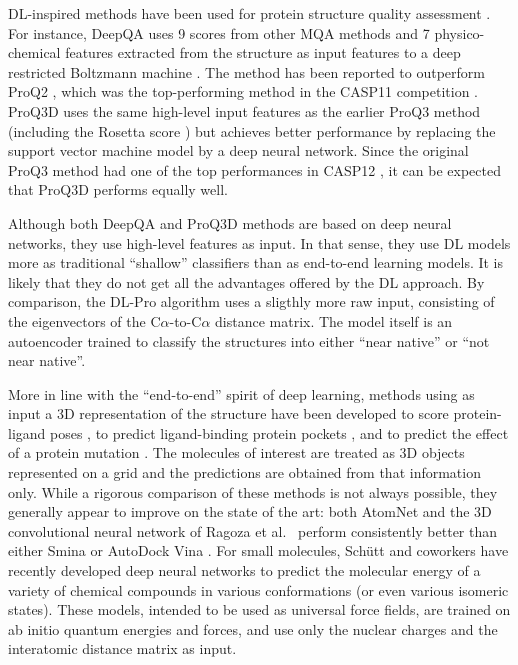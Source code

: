 \documentclass{bioinfo}
\begin{document}
DL-inspired methods have been used for protein structure quality
assessment \citep{nguyen2014dlpro, cao2016deepqa,
uziela2017proq3d}. For instance, DeepQA \citep{cao2016deepqa} uses 9
scores from other MQA methods and 7 physico-chemical features
extracted from the structure as input features to a deep restricted
Boltzmann machine \citep{hinton2006fast}. The method has been
reported to outperform ProQ2 \citep{ray2012proq2},
which was the top-performing method in the CASP11
competition \citep{kryshtafovych2015}.  ProQ3D \citep{uziela2017proq3d}
uses the same high-level input features as the earlier ProQ3
method \citep{uziela2016proq3} (including the
Rosetta score \citep{leaverfay2011rosetta}) but achieves better
performance by replacing the support vector machine model by a deep
neural network. Since the original ProQ3 method had one of the top
performances in CASP12 \citep{elofsson2017qacasp12}, it can be expected
that ProQ3D performs equally well.

Although both DeepQA and ProQ3D
methods are based on deep neural networks, they use high-level
features as input. In that sense, they use DL models more as
traditional ``shallow'' classifiers than as end-to-end learning
models. It is likely that they do not get all the advantages offered
by the DL approach.
By comparison, the DL-Pro algorithm \citep{nguyen2014dlpro} uses a
sligthly more raw input, consisting of the eigenvectors of the
C$\alpha$-to-C$\alpha$ distance matrix. The model itself is an
autoencoder \citep{hinton2006reducing} trained to classify the
structures into either ``near native'' or ``not near native''.

More in line with the ``end-to-end'' spirit of deep learning, methods
using as input a 3D representation of the structure have been
developed to score protein-ligand poses \citep{wallach2015atomnet,
ragoza2017protein}, to predict ligand-binding protein
pockets \citep{jimenez2017deepsite}, and to predict the effect of a
protein mutation \citep{torng2017}. The molecules of interest are
treated as 3D objects represented on a grid and the predictions are
obtained from that information only. While a rigorous comparison of
these methods is not always possible, they generally appear to
improve on the state of the art: both
AtomNet \citep{wallach2015atomnet} and the 3D convolutional neural
network of Ragoza et al.\ \citep{ragoza2017protein} perform
consistently better than either Smina \citep{koes2013smina} or AutoDock
Vina \citep{trott2009vina}.
For small molecules, Sch\"{u}tt and coworkers \cite{schutt2017quantum,
schutt2017moleculenet} have recently developed deep neural networks to predict
the molecular energy of a variety of chemical compounds in various
conformations (or even various isomeric states). These models,
intended to be used as universal force fields, are trained on ab
initio quantum energies and forces, and use only the nuclear charges and the
interatomic distance matrix as input.
\end{document}
